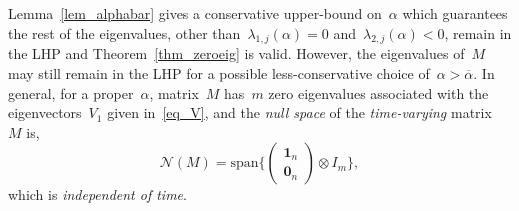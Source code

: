 \documentclass[letterpaper, 10pt, conference]{ieeeconf}
\def\mb{\mathbf}
\def\mc{\mathcal}
\begin{document}
Lemma~\ref{lem_alphabar} gives a conservative upper-bound on~$\alpha$ which guarantees the rest of the eigenvalues, other than~$\lambda_{1,j}(\alpha)=0$ and~$\lambda_{2,j}(\alpha)<0$, remain in the LHP and Theorem~\ref{thm_zeroeig} is valid.	However, the eigenvalues of~$M$ may still remain in the LHP for a possible less-conservative choice of~$\alpha>\overline{\alpha}$. In general, for a proper~$\alpha$, matrix~$M$ has~$m$ zero eigenvalues associated with the eigenvectors~$V_1$ given in~\eqref{eq_V}, and the \textit{null space} of the \textit{time-varying} matrix~$M$ is,
\begin{equation}
	\mc{N}(M) = \text{span}\{\left(\begin{array}{c}
		\mb{1}_n \\
		\mb{0}_n  
	\end{array} \right)\otimes I_m\},
\end{equation}
which is \textit{independent of time}.
\end{document}
